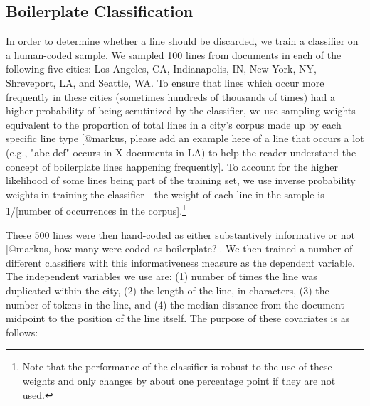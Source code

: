 \documentclass[11pt]{article}
\begin{document}
\subsection*{Boilerplate Classification}
In order to determine whether a line should be discarded, we train a classifier on a human-coded sample. We sampled 100 lines from documents in each of the following five cities: Los Angeles, CA, Indianapolis, IN, New York, NY, Shreveport, LA, and Seattle, WA. To ensure that lines which occur more frequently in these cities (sometimes hundreds of thousands of times) had a higher probability of being scrutinized by the classifier, we use sampling weights equivalent to the proportion of total lines in a city's corpus made up by each specific line type [@markus, please add an example here of a line that occurs a lot (e.g., "abc def" occurs in X documents in LA) to help the reader understand the concept of boilerplate lines happening frequently]. To account for the higher likelihood of some lines being part of the training set, we use inverse probability weights in training the classifier---the weight of each line in the sample is 1/[number of occurrences in the corpus].\footnote{Note that the performance of the classifier is robust to the use of these weights and only changes by about one percentage point if they are not used.}

These 500 lines were then hand-coded as either substantively informative or not [@markus, how many were coded as boilerplate?]. We then trained a number of different classifiers with this informativeness measure as the dependent variable. The independent variables we use are: (1) number of times the line was duplicated within the city, (2) the length of the line, in characters, (3) the number of tokens in the line, and (4) the median distance from the document midpoint to the position of the line itself. The purpose of these covariates is as follows:
\end{document}
